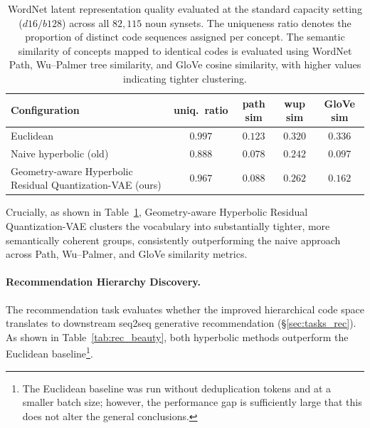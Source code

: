 \documentclass[12pt]{report}
\begin{document}
\begin{table}[h]
\centering
\caption{WordNet latent representation quality evaluated at the standard capacity setting ($d16/b128$) across all $82{,}115$ noun synsets. The uniqueness ratio denotes the proportion of distinct code sequences assigned per concept. The semantic similarity of concepts mapped to identical codes is evaluated using WordNet Path, Wu--Palmer tree similarity, and GloVe cosine similarity, with higher values indicating tighter clustering.}
\label{tab:nlp_repr}
\begin{tabular}{lcccc}
\hline
Configuration & uniq.\ ratio & path sim & wup sim & GloVe sim \\
\hline
Euclidean & $0.997$ & $0.123$ & $0.320$ & $0.336$ \\
Naive hyperbolic (old) & $0.888$ & $0.078$ & $0.242$ & $0.097$ \\
Geometry-aware Hyperbolic Residual Quantization-VAE (ours) & $0.967$ & $0.088$ & $0.262$ & $0.162$ \\
\hline
\end{tabular}
\end{table}

Crucially, as shown in Table~\ref{tab:nlp_repr}, Geometry-aware Hyperbolic Residual Quantization-VAE clusters the vocabulary into substantially tighter, more semantically coherent groups, consistently outperforming the naive approach across Path, Wu--Palmer, and GloVe similarity metrics.

\paragraph{Recommendation Hierarchy Discovery.}
The recommendation task evaluates whether the improved hierarchical code space translates to downstream seq2seq generative recommendation (\S\ref{sec:tasks_rec}). As shown in Table~\ref{tab:rec_beauty}, both hyperbolic methods outperform the Euclidean baseline\footnote{The Euclidean baseline was run without deduplication tokens and at a smaller batch size; however, the performance gap is sufficiently large that this does not alter the general conclusions.}. 
\end{document}
